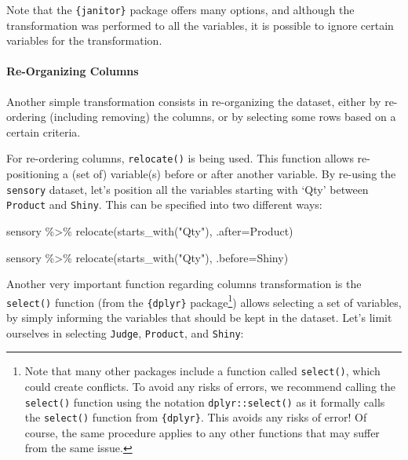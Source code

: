 \documentclass[
]{book}
\newenvironment{Shaded}{\begin{snugshade}}{\end{snugshade}}
\newcommand{\AttributeTok}[1]{\textcolor[rgb]{0.77,0.63,0.00}{#1}}
\newcommand{\FunctionTok}[1]{\textcolor[rgb]{0.00,0.00,0.00}{#1}}
\newcommand{\NormalTok}[1]{#1}
\newcommand{\SpecialCharTok}[1]{\textcolor[rgb]{0.00,0.00,0.00}{#1}}
\newcommand{\StringTok}[1]{\textcolor[rgb]{0.31,0.60,0.02}{#1}}
\begin{document}
Note that the \texttt{\{janitor\}} package offers many options, and although the transformation was performed to all the variables, it is possible to ignore certain variables for the transformation.

\hypertarget{re-organizing-columns}{%
\paragraph{Re-Organizing Columns}\label{re-organizing-columns}}

Another simple transformation consists in re-organizing the dataset, either by re-ordering (including removing) the columns, or by selecting some rows based on a certain criteria.

For re-ordering columns, \texttt{relocate()} is being used. This function allows re-positioning a (set of) variable(s) before or after another variable. By re-using the \texttt{sensory} dataset, let's position all the variables starting with `Qty' between \texttt{Product} and \texttt{Shiny}. This can be specified into two different ways:

\begin{Shaded}
\begin{Highlighting}[]
\NormalTok{sensory }\SpecialCharTok{\%\textgreater{}\%} 
  \FunctionTok{relocate}\NormalTok{(}\FunctionTok{starts\_with}\NormalTok{(}\StringTok{"Qty"}\NormalTok{), }\AttributeTok{.after=}\NormalTok{Product)}

\NormalTok{sensory }\SpecialCharTok{\%\textgreater{}\%} 
  \FunctionTok{relocate}\NormalTok{(}\FunctionTok{starts\_with}\NormalTok{(}\StringTok{"Qty"}\NormalTok{), }\AttributeTok{.before=}\NormalTok{Shiny)}
\end{Highlighting}
\end{Shaded}

Another very important function regarding columns transformation is the \texttt{select()} function (from the \texttt{\{dplyr\}} package\footnote{Note that many other packages include a function called \texttt{select()}, which could create conflicts. To avoid any risks of errors, we recommend calling the \texttt{select()} function using the notation \texttt{dplyr::select()} as it formally calls the \texttt{select()} function from \texttt{\{dplyr\}}. This avoids any risks of error! Of course, the same procedure applies to any other functions that may suffer from the same issue.}) allows selecting a set of variables, by simply informing the variables that should be kept in the dataset. Let's limit ourselves in selecting \texttt{Judge}, \texttt{Product}, and \texttt{Shiny}:
\end{document}
